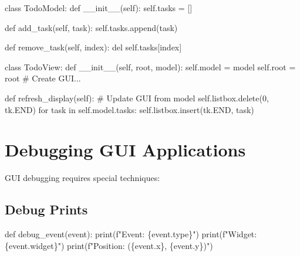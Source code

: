 \documentclass[
  letterpaper,
  DIV=11,
  numbers=noendperiod,
  oneside]{scrreprt}
\newenvironment{Shaded}{}{}
\newcommand{\BuiltInTok}[1]{\textcolor[rgb]{0.84,0.23,0.29}{#1}}
\newcommand{\CommentTok}[1]{\textcolor[rgb]{0.42,0.45,0.49}{#1}}
\newcommand{\ControlFlowTok}[1]{\textcolor[rgb]{0.84,0.23,0.29}{#1}}
\newcommand{\DecValTok}[1]{\textcolor[rgb]{0.00,0.36,0.77}{#1}}
\newcommand{\FunctionTok}[1]{\textcolor[rgb]{0.44,0.26,0.76}{#1}}
\newcommand{\KeywordTok}[1]{\textcolor[rgb]{0.84,0.23,0.29}{#1}}
\newcommand{\NormalTok}[1]{\textcolor[rgb]{0.14,0.16,0.18}{#1}}
\newcommand{\OperatorTok}[1]{\textcolor[rgb]{0.14,0.16,0.18}{#1}}
\newcommand{\SpecialCharTok}[1]{\textcolor[rgb]{0.00,0.36,0.77}{#1}}
\newcommand{\SpecialStringTok}[1]{\textcolor[rgb]{0.01,0.18,0.38}{#1}}
\newcommand{\VariableTok}[1]{\textcolor[rgb]{0.89,0.38,0.04}{#1}}
\begin{document}
\begin{Shaded}
\begin{Highlighting}[]
\KeywordTok{class}\NormalTok{ TodoModel:}
    \KeywordTok{def} \FunctionTok{\_\_init\_\_}\NormalTok{(}\VariableTok{self}\NormalTok{):}
        \VariableTok{self}\NormalTok{.tasks }\OperatorTok{=}\NormalTok{ []}
    
    \KeywordTok{def}\NormalTok{ add\_task(}\VariableTok{self}\NormalTok{, task):}
        \VariableTok{self}\NormalTok{.tasks.append(task)}
    
    \KeywordTok{def}\NormalTok{ remove\_task(}\VariableTok{self}\NormalTok{, index):}
        \KeywordTok{del} \VariableTok{self}\NormalTok{.tasks[index]}

\KeywordTok{class}\NormalTok{ TodoView:}
    \KeywordTok{def} \FunctionTok{\_\_init\_\_}\NormalTok{(}\VariableTok{self}\NormalTok{, root, model):}
        \VariableTok{self}\NormalTok{.model }\OperatorTok{=}\NormalTok{ model}
        \VariableTok{self}\NormalTok{.root }\OperatorTok{=}\NormalTok{ root}
        \CommentTok{\# Create GUI...}
    
    \KeywordTok{def}\NormalTok{ refresh\_display(}\VariableTok{self}\NormalTok{):}
        \CommentTok{\# Update GUI from model}
        \VariableTok{self}\NormalTok{.listbox.delete(}\DecValTok{0}\NormalTok{, tk.END)}
        \ControlFlowTok{for}\NormalTok{ task }\KeywordTok{in} \VariableTok{self}\NormalTok{.model.tasks:}
            \VariableTok{self}\NormalTok{.listbox.insert(tk.END, task)}
\end{Highlighting}
\end{Shaded}

\section{Debugging GUI Applications}\label{debugging-gui-applications}

GUI debugging requires special techniques:

\subsection{Debug Prints}\label{debug-prints}

\begin{Shaded}
\begin{Highlighting}[]
\KeywordTok{def}\NormalTok{ debug\_event(event):}
    \BuiltInTok{print}\NormalTok{(}\SpecialStringTok{f"Event: }\SpecialCharTok{\{}\NormalTok{event}\SpecialCharTok{.}\BuiltInTok{type}\SpecialCharTok{\}}\SpecialStringTok{"}\NormalTok{)}
    \BuiltInTok{print}\NormalTok{(}\SpecialStringTok{f"Widget: }\SpecialCharTok{\{}\NormalTok{event}\SpecialCharTok{.}\NormalTok{widget}\SpecialCharTok{\}}\SpecialStringTok{"}\NormalTok{)}
    \BuiltInTok{print}\NormalTok{(}\SpecialStringTok{f"Position: (}\SpecialCharTok{\{}\NormalTok{event}\SpecialCharTok{.}\NormalTok{x}\SpecialCharTok{\}}\SpecialStringTok{, }\SpecialCharTok{\{}\NormalTok{event}\SpecialCharTok{.}\NormalTok{y}\SpecialCharTok{\}}\SpecialStringTok{)"}\NormalTok{)}
\end{Highlighting}
\end{Shaded}
\end{document}
